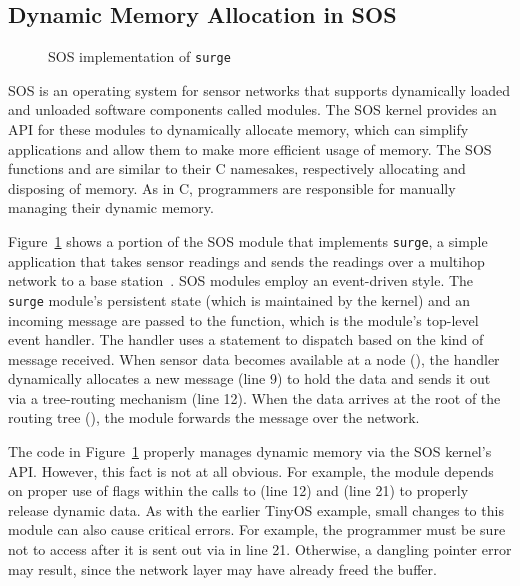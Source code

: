\subsection{Dynamic Memory Allocation in SOS}

\begin{figure}[t]

\caption{SOS implementation of {\tt surge}\label{fig:surge}}
\end{figure}

SOS is an operating system for sensor networks that 
supports dynamically loaded and unloaded software components called modules.
The SOS kernel provides an API for these modules to dynamically
allocate memory, which can simplify applications and allow them to
make more efficient usage of memory.
The SOS functions  and  are similar
to their C namesakes, respectively
allocating and disposing of memory.  
As in C, programmers are responsible for manually managing their
dynamic memory.  

Figure~\ref{fig:surge} shows a portion of the SOS module that
implements {\tt surge}, a simple application that takes
sensor readings and sends the readings over a multihop network to a
base station~\cite{nesC}.  SOS modules employ an event-driven style.  
The {\tt surge} module's persistent state (which is maintained by the
kernel) and an
incoming message are passed to the  function,
which is the module's top-level event handler.  The handler
uses a  statement to dispatch based on the kind of
message received.  
When sensor data becomes available at a node
(), the handler dynamically 
allocates a new message (line
9) to hold the data and sends it out via a tree-routing mechanism
(line 12).  %
When the data arrives at the root of the
routing tree
(), the module %
forwards the
message over the network.

The code in Figure~\ref{fig:surge} properly manages dynamic memory via the
SOS kernel's API.  However, this fact is
not at all obvious.  For example, the module depends on
proper use of flags within the calls to  (line 12) and 
 (line 21)
to properly release dynamic data.
As with the earlier TinyOS example, small
changes to this module can also cause critical errors.  For example,
the programmer must be sure not to access  after it is sent
out via
 in line 21.  Otherwise, a dangling pointer error may
result, since the network layer may have already freed the buffer. 

